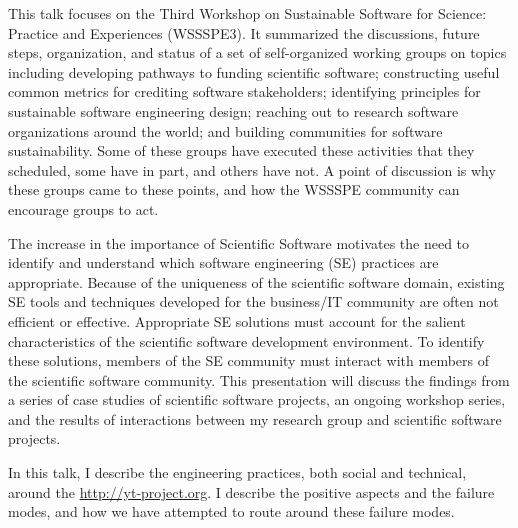 \documentclass[a4paper,UKenglish]{dagrep}
\begin{document}
This talk focuses on the Third Workshop on Sustainable Software for Science: Practice and Experiences (WSSSPE3). It summarized the discussions, future steps, organization, and status of a set of self-organized working groups on topics including developing pathways to funding scientific software; constructing useful common metrics for crediting software stakeholders; identifying principles for sustainable software engineering design; reaching out to research software organizations around the world; and building communities for software sustainability. Some of these groups have executed these activities that they scheduled, some have in part, and others have not.  A point of discussion is why these groups came to these points, and how the WSSSPE community can encourage groups to act.



  
The increase in the importance of Scientific Software motivates the need to identify and understand which software engineering (SE) practices are appropriate. Because of the uniqueness of the scientific software domain, existing SE tools and techniques developed for the business/IT community are often not efficient or effective. Appropriate SE solutions must account for the salient characteristics of the scientific software development environment. To identify these solutions, members of the SE community must interact with members of the scientific software community. This presentation will discuss the findings from a series of case studies of scientific software projects, an ongoing workshop series, and the results of interactions between my research group and scientific software projects.


In this talk, I describe the engineering practices, both social and
technical, around the \href{yt project}{http://yt-project.org}.  I describe the
positive aspects and the failure modes, and how we have attempted to
route around these failure modes.
\end{document}
